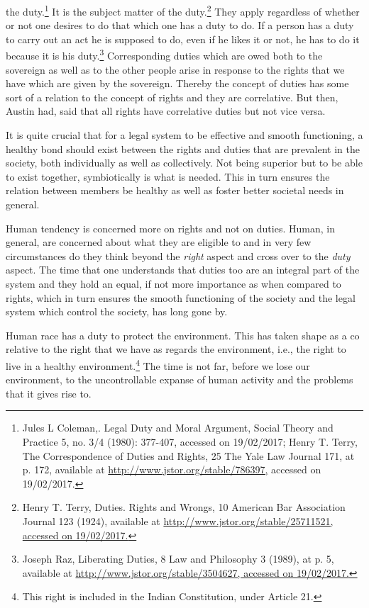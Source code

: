 \begin{multicols}{2}
the duty.\footnote{Jules L Coleman,. Legal Duty and Moral Argument, Social Theory and Practice 5, no. 3/4 (1980): 377-407, accessed on 19/02/2017; Henry T. Terry, The Correspondence of Duties and Rights, 25 The Yale Law Journal 171, at p. 172, available at \url{http://www.jstor.org/stable/786397,} accessed on 19/02/2017.} It is the subject matter of the duty.\footnote{Henry T. Terry, Duties. Rights and Wrongs, 10 American Bar Association Journal 123 (1924), available at  \url{http://www.jstor.org/stable/25711521, accessed on 19/02/2017.}} They apply regardless of whether or not one desires to do that which one has a duty to do. If a person has a duty to carry out an act he is supposed to do, even if he likes it or not, he has to do it because it is his duty.\footnote{Joseph Raz, Liberating Duties, 8 Law and Philosophy 3 (1989), at p. 5, available at  \url{http://www.jstor.org/stable/3504627, accessed on 19/02/2017.}} Corresponding duties which are owed both to the sovereign as well as to the other people arise in response to the rights that we have which are given by the sovereign. Thereby the concept of duties has
some sort of a relation to the concept of rights and they are correlative. But then, Austin had,
said that all rights have correlative duties but not vice versa.

\noi
It is quite crucial that for a legal system to be effective and smooth functioning, a healthy bond
should exist between the rights and duties that are prevalent in the society, both individually as
well as collectively. Not being superior but to be able to exist together, symbiotically is what
is needed. This in turn ensures the relation between members be healthy as well as foster better
societal needs in general.

\noi
Human tendency is concerned more on rights and not on duties. Human, in general, are
concerned about what they are eligible to and in very few circumstances do they think beyond
the \textit{right} aspect and cross over to the \textit{duty} aspect. The time that one understands that duties too
are an integral part of the system and they hold an equal, if not more importance as when
compared to rights, which in turn ensures the smooth functioning of the society and the legal
system which control the society, has long gone by.


\noi
Human race has a duty to protect the environment. This has taken shape as a co relative to the
right that we have as regards the environment, i.e., the right to live in a healthy environment.\footnote{This right is included in the Indian Constitution, under Article 21.}
The time is not far, before we lose our environment, to the uncontrollable expanse of human
activity and the problems that it gives rise to.


\end{multicols}
